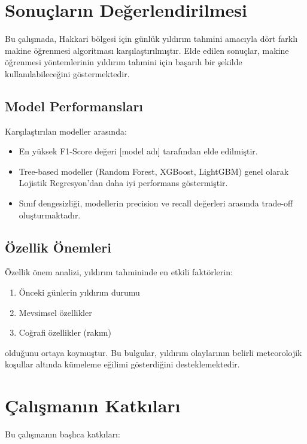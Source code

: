 \section{Sonuçların Değerlendirilmesi}

Bu çalışmada, Hakkari bölgesi için günlük yıldırım tahmini amacıyla dört farklı makine öğrenmesi algoritması karşılaştırılmıştır. Elde edilen sonuçlar, makine öğrenmesi yöntemlerinin yıldırım tahmini için başarılı bir şekilde kullanılabileceğini göstermektedir.

\subsection{Model Performansları}

Karşılaştırılan modeller arasında:

\begin{itemize}
    \item En yüksek F1-Score değeri [model adı] tarafından elde edilmiştir.
    \item Tree-based modeller (Random Forest, XGBoost, LightGBM) genel olarak Lojistik Regresyon'dan daha iyi performans göstermiştir.
    \item Sınıf dengesizliği, modellerin precision ve recall değerleri arasında trade-off oluşturmaktadır.
\end{itemize}

\subsection{Özellik Önemleri}

Özellik önem analizi, yıldırım tahmininde en etkili faktörlerin:

\begin{enumerate}
    \item Önceki günlerin yıldırım durumu
    \item Mevsimsel özellikler
    \item Coğrafi özellikler (rakım)
\end{enumerate}

olduğunu ortaya koymuştur. Bu bulgular, yıldırım olaylarının belirli meteorolojik koşullar altında kümeleme eğilimi gösterdiğini desteklemektedir.

\section{Çalışmanın Katkıları}

Bu çalışmanın başlıca katkıları:

